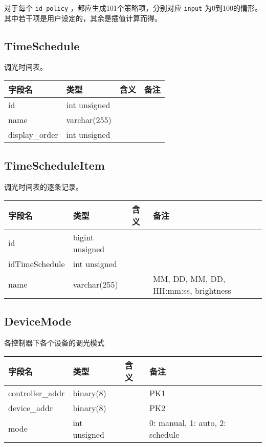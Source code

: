 对于每个 \texttt{id\_policy} ，都应生成101个策略项，分别对应
\texttt{input}
为0到100的情形。其中若干项是用户设定的，其余是插值计算而得。

\subsection{TimeSchedule}\label{timeschedule}

调光时间表。

\begin{longtabu}[c]{@{}lXXX@{}}
\toprule
字段名 & 类型 & 含义 & 备注\tabularnewline
\midrule
\endhead
id & int unsigned & &\tabularnewline
name & varchar(255) & &\tabularnewline
display\_order & int unsigned & &\tabularnewline
\bottomrule
\end{longtabu}

\subsection{TimeScheduleItem}\label{timescheduleitem}

调光时间表的逐条记录。

\begin{longtabu}[c]{@{}lXXX@{}}
\toprule
字段名 & 类型 & 含义 & 备注\tabularnewline
\midrule
\endhead
id & bigint unsigned & &\tabularnewline
idTimeSchedule & int unsigned & &\tabularnewline
name & varchar(255) & & MM, DD, MM, DD, HH:mm:ss,
brightness\tabularnewline
\bottomrule
\end{longtabu}

\subsection{DeviceMode}\label{devicemode}

各控制器下各个设备的调光模式

\begin{longtabu}[c]{@{}lXXX@{}}
\toprule
字段名 & 类型 & 含义 & 备注\tabularnewline
\midrule
\endhead
controller\_addr & binary(8) & & PK1\tabularnewline
device\_addr & binary(8) & & PK2\tabularnewline
mode & int unsigned & & 0: manual, 1: auto, 2: schedule\tabularnewline
\bottomrule
\end{longtabu}
